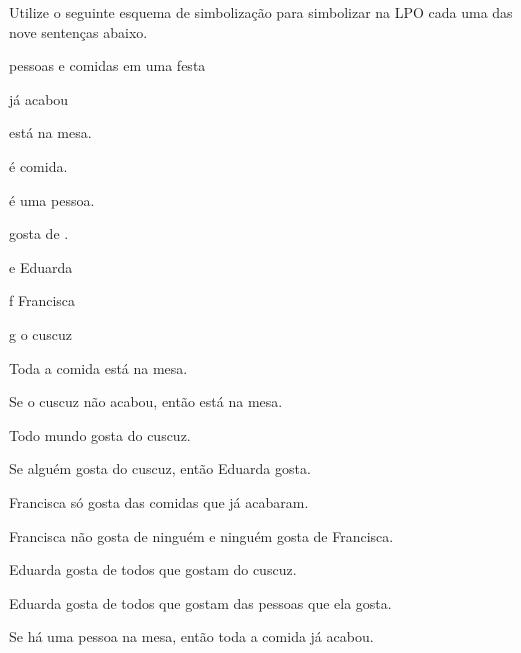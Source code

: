 \problempart
Utilize o seguinte esquema de simbolização para simbolizar na LPO cada uma das nove sentenças abaixo.
\begin{center}
\begin{ekey}
\item[\text{domínio}] pessoas e comidas em uma festa
\item[\atom{A}{x}]  já acabou
\item[\atom{M}{x}]  está na mesa.
\item[\atom{C}{x}]  é comida.
\item[\atom{P}{x}]  é uma pessoa.
\item[\atom{G}{x,y}]  gosta de .
\item[e] Eduarda
\item[f] Francisca
\item[g] o cuscuz
\end{ekey}
\end{center}
\begin{earg}
\item Toda a comida está na mesa.
\item Se o cuscuz não acabou, então está na mesa.
\item Todo mundo gosta do cuscuz.
\item Se alguém gosta do cuscuz, então Eduarda gosta.
\item Francisca só gosta das comidas que já acabaram.
\item Francisca não gosta de ninguém e ninguém gosta de Francisca.
\item Eduarda gosta de todos que gostam do cuscuz.
\item Eduarda gosta de todos que gostam das pessoas que ela gosta.
\item Se há uma pessoa na mesa, então toda a comida já acabou.
\end{earg}


